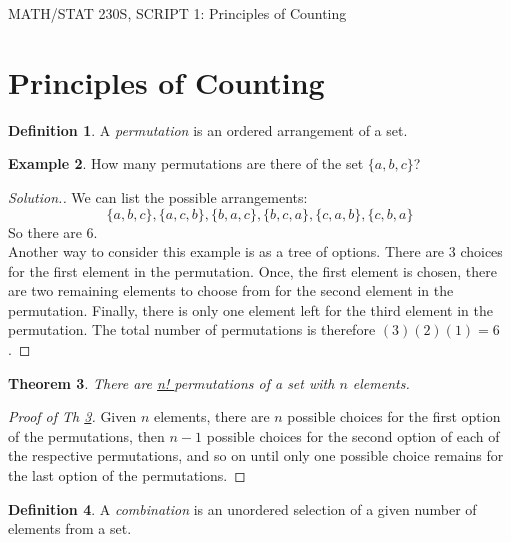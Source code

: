 \documentclass[12pt]{article}
\renewcommand{\_}[1]{\underline{ #1 }}
\newtheorem{theorem}{Theorem}[section]
\theoremstyle{definition}
\newtheorem{definition}[theorem]{Definition}
\newtheorem{example}[theorem]{Example}
\numberwithin{equation}{subsection}
\begin{document}
\begin{center}
{\large MATH/STAT 230S, SCRIPT 1: Principles of Counting} \\ 
\vspace{.2in}  

\end{center}

\section{Principles of Counting}
\begin{definition}
	A \emph{permutation} is an ordered arrangement of a set.
\end{definition}



\begin{example} How many permutations are there of the set $\{a,b,c\}$?

	\begin{proof}[Solution.] 
		We can list the possible arrangements: $$\{a,b,c\}, \{a,c,b\}, \{b,a, c\}, \{b,c,a\}, \{c,a,b\}, \{c,b,a\}$$ So there are 6.\\ 
		Another way to consider this example is as a tree of options. There are 3 choices for the first element in the permutation. Once, the first element is chosen, there are two remaining elements to choose from for the second element in the permutation. Finally, there is only one element left for the third element in the permutation. The total number of permutations is therefore $(3)(2)(1)=6$.
	\end{proof}

\end{example}


\begin{theorem}\label{permutations}
	There are \_{n!} permutations of a set with $n$ elements.
\end{theorem}


\begin{proof}[Proof of Th \ref{permutations}]
Given $n$ elements, there are $n$ possible choices for the first option of the permutations, then $n-1$ possible choices for the second option of each of the respective permutations, and so on until only one possible choice remains for the last option of the permutations.
\end{proof}


\begin{definition}
	A \emph{combination} is an unordered selection of a given number of elements from a set.
\end{definition}
\end{document}

